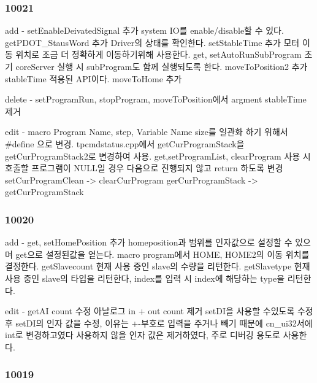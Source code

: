 \subsubsection*{10021}

\begin{DoxyVerb}     add  - setEnableDeivatedSignal 추가 system IO를 enable/disable할 수 있다.
            getPDOT_StausWord 추가 Driver의 상태를 확인한다.
            setStableTime 추가 모터 이동 위치로 조금 더 정확하게 이동하기위해 사용한다.
            get, setAutoRunSubProgram 초기 coreServer 실행 시 subProgram도 함께 실행되도록 한다.
            moveToPosition2 추가 stableTime 적용된 API이다.
            moveToHome 추가

     delete - setProgramRun, stopProgram, moveToPosition에서 argment stableTime 제거

     edit - macro Program Name, step, Variable Name size를 일관화 하기 위해서 #define 으로 변경.
            tpcmdstatus.cpp에서 getCurProgramStack을 getCurProgramStack2로 변경하여 사용.
            get,setProgramList, clearProgram 사용 시 호출할 프로그램이 NULL일 경우 다음으로 진행되지 않고 return 하도록 변경
            setCurProgramClean -> clearCurProgram
            gerCurProgramStack -> getCurProgramStack
\end{DoxyVerb}


\subsubsection*{10020}

\begin{DoxyVerb}     add  - get, setHomePosition 추가 homeposition과 범위를 인자값으로 설정할 수 있으며 get으로 설정된값을 얻는다.
            macro program에서 HOME, HOME2의 이동 위치를 결정한다.
            getSlavecount 현재 사용 중인 slave의 수량을 리턴한다.
            getSlavetype 현재 사용 중인 slave의 타입을 리턴한다, index를 입력 시 index에 해당하는 type을 리턴한다.

     edit - getAI count 수정 아날로그 in + out count 제거
            setDI을 사용할 수있도록 수정 후 setDI의 인자 값을 수정, 이유는 +-부호로 입력을 주거나 빼기 때문에 cn_ui32서에 int로 변경하고였다
            사용하지 않을 인자 값은 제거하였다, 주로 디버깅 용도로 사용한다.
\end{DoxyVerb}


\subsubsection*{10019 }

